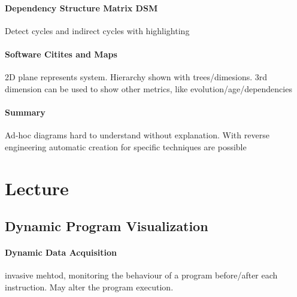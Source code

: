 \documentclass[ngerman]{scrartcl}
\begin{document}
\paragraph{Dependency Structure Matrix DSM}
Detect cycles and indirect cycles with highlighting
\paragraph{Software Citites and Maps}
2D plane represents system. Hierarchy shown with trees/dimesions. 3rd dimension can be used to show other metrics, like evolution/age/dependencies
\paragraph{Summary}
Ad-hoc diagrams hard to understand without explanation. With reverse engineering automatic creation for specific techniques are possible	 

\section{Lecture}
\subsection{Dynamic Program Visualization}

\paragraph{Dynamic Data Acquisition} invasive mehtod, monitoring the behaviour of a program before/after each instruction. May alter the program execution. 
\end{document}
